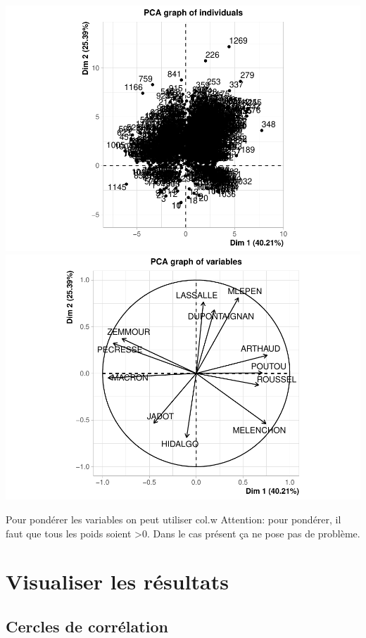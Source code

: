 \documentclass[
]{book}
\begin{document}
\includegraphics{manuel_geo_quanti_files/figure-latex/unnamed-chunk-60-1.pdf} \includegraphics{manuel_geo_quanti_files/figure-latex/unnamed-chunk-60-2.pdf}

Pour pondérer les variables on peut utiliser col.w Attention: pour pondérer, il faut que tous les poids soient \textgreater0. Dans le cas présent ça ne pose pas de problème.

\hypertarget{visualiser-les-ruxe9sultats}{%
\section{Visualiser les résultats}\label{visualiser-les-ruxe9sultats}}

\hypertarget{cercles-de-corruxe9lation}{%
\subsection{Cercles de corrélation}\label{cercles-de-corruxe9lation}}
\end{document}

